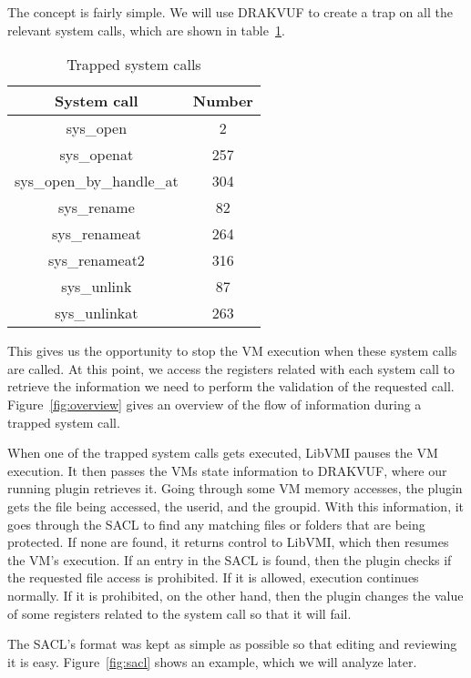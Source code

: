 \par The concept is fairly simple. We will use DRAKVUF to create a trap on all the relevant system calls, which are shown in table~\ref{tbl:syscalls}.

\begin{table}[h]
	\centering
	\caption{Trapped system calls}
	\label{tbl:syscalls}
	\begin{tabular}{cc}
		\toprule
		System call & Number \\
		\hline
		sys\_open & 2 \\ sys\_openat & 257 \\ sys\_open\_by\_handle\_at & 304 \\
		sys\_rename & 82 \\ sys\_renameat & 264 \\  sys\_renameat2 & 316 \\ 
		sys\_unlink & 87 \\ sys\_unlinkat & 263 \\
		\bottomrule
\end{tabular}	
\end{table}

This gives us the opportunity to stop the \ac{VM} execution when these system calls are called. At this point, we access the registers related with each system call to retrieve the information we need to perform the validation of the requested call. Figure~\ref{fig:overview} gives an overview of the flow of information during a trapped system call. 

\par When one of the trapped system calls gets executed, LibVMI pauses the \ac{VM} execution. It then passes the \ac{VM}s state information to DRAKVUF, where our running plugin retrieves it. Going through some \ac{VM} memory accesses, the plugin gets the file being accessed, the userid, and the groupid. With this information, it goes through the \ac{SACL} to find any matching files or folders that are being protected. If none are found, it returns control to LibVMI, which then resumes the \ac{VM}'s execution. If an entry in the \ac{SACL} is found, then the plugin checks if the requested file access is prohibited. If it is allowed, execution continues normally. If it is prohibited, on the other hand, then the plugin changes the value of some registers related to the system call so that it will fail.

\par The \ac{SACL}'s format was kept as simple as possible so that editing and reviewing it is easy. Figure~\ref{fig:sacl} shows an example, which we will analyze later.

